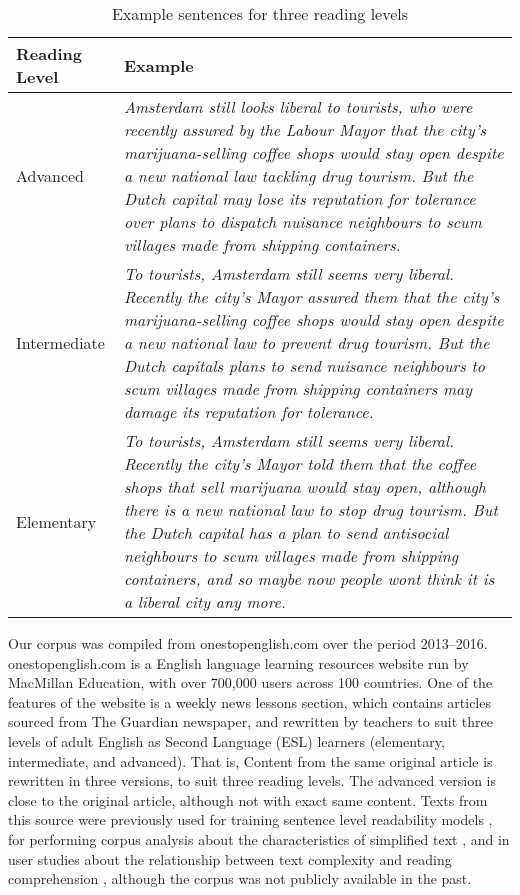 \documentclass[11pt,a4paper]{article}
\begin{document}
\begin{table*}
\label{tab:textexample}
\begin{tabular}{|l|p{12cm}|}
\hline \textbf{Reading Level} & \textbf{Example}\\
\hline Advanced & \textit{Amsterdam still looks liberal to tourists, who were recently assured by the Labour Mayor that the city's marijuana-selling coffee shops would stay open despite a new national law tackling drug tourism. But the Dutch capital may lose its reputation for tolerance over plans to dispatch nuisance neighbours to scum villages made from shipping containers.}\\
\hline Intermediate & \textit{To tourists, Amsterdam still seems very liberal. Recently the city's Mayor assured them that the city's marijuana-selling coffee shops would stay open despite a new national law to prevent drug tourism. But the Dutch capitals plans to send nuisance neighbours to scum villages made from shipping containers may damage its reputation for tolerance.} \\
\hline Elementary & \textit{To tourists, Amsterdam still seems very liberal. Recently the city's Mayor told them that the coffee shops that sell marijuana would stay open, although there is a new national law to stop drug tourism. But the Dutch capital has a plan to send antisocial neighbours to scum villages made from shipping containers, and so maybe now people wont think it is a liberal city any more.}\\
\hline \end{tabular}
\label{tab:example}
\caption{Example sentences for three reading levels}
\end{table*}

Our corpus was compiled from onestopenglish.com over the period 2013--2016. onestopenglish.com is a English language learning resources website run by MacMillan Education, with over 700,000 users across 100 countries. One of the features of the website is a weekly news lessons section, which contains articles sourced from The Guardian newspaper, and rewritten by teachers to suit three levels of adult English as Second Language (ESL) learners (elementary, intermediate, and advanced). That is, Content from the same original article is rewritten in three versions, to suit three reading levels. The advanced version is close to the original article, although not with exact same content. Texts from this source were previously used for training sentence level readability models \cite{Vajjala.Meurers-16,Ambati.Reddy.ea-16,Howcroft.Demberg-17}, for performing corpus analysis about the characteristics of simplified text \cite{Allen-09}, and in user studies about the relationship between text complexity and reading comprehension \cite{Crossley.Yang.ea-14,Vajjala.Meurers.ea-16}, although the corpus was not publicly available in the past.
\end{document}
